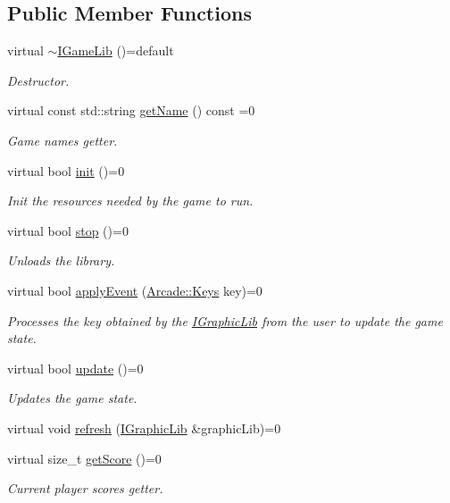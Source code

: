 \subsection*{Public Member Functions}
\begin{DoxyCompactItemize}
\item 
virtual \hyperlink{class_arcade_1_1_i_game_lib_a3243f08b84930f3ff29d82d9a2a43582}{$\sim$\+I\+Game\+Lib} ()=default
\begin{DoxyCompactList}\small\item\em Destructor. \end{DoxyCompactList}\item 
virtual const std\+::string \hyperlink{class_arcade_1_1_i_game_lib_afd2652d62ebfda4caa5d0c05ff40ed61}{get\+Name} () const =0
\begin{DoxyCompactList}\small\item\em Game name\textquotesingle{}s getter. \end{DoxyCompactList}\item 
virtual bool \hyperlink{class_arcade_1_1_i_game_lib_aacc4169a98dfeb007bcaf9dfeece9e08}{init} ()=0
\begin{DoxyCompactList}\small\item\em Init the resources needed by the game to run. \end{DoxyCompactList}\item 
virtual bool \hyperlink{class_arcade_1_1_i_game_lib_ab9b7c1bbbea1b86e8515e8fd188fe9cb}{stop} ()=0
\begin{DoxyCompactList}\small\item\em Unloads the library. \end{DoxyCompactList}\item 
virtual bool \hyperlink{class_arcade_1_1_i_game_lib_a3b1b66ec00899b4c9efcd6151bf2497e}{apply\+Event} (\hyperlink{namespace_arcade_a9b501908b20bc993e4f8226db5323c41}{Arcade\+::\+Keys} key)=0
\begin{DoxyCompactList}\small\item\em Processes the key obtained by the \hyperlink{class_arcade_1_1_i_graphic_lib}{I\+Graphic\+Lib} from the user to update the game state. \end{DoxyCompactList}\item 
virtual bool \hyperlink{class_arcade_1_1_i_game_lib_a0be7ffaa269e2fa47146bf27ad2c511a}{update} ()=0
\begin{DoxyCompactList}\small\item\em Updates the game state. \end{DoxyCompactList}\item 
virtual void \hyperlink{class_arcade_1_1_i_game_lib_a00c3d335ef313e441217b33dcf7844df}{refresh} (\hyperlink{class_arcade_1_1_i_graphic_lib}{I\+Graphic\+Lib} \&graphic\+Lib)=0
\item 
virtual size\+\_\+t \hyperlink{class_arcade_1_1_i_game_lib_a00cdcad68c670aecbcc249a2995833b6}{get\+Score} ()=0
\begin{DoxyCompactList}\small\item\em Current player score\textquotesingle{}s getter. \end{DoxyCompactList}\end{DoxyCompactItemize}



